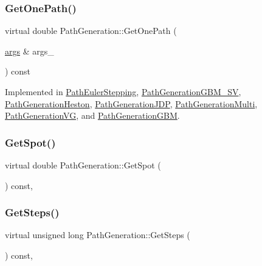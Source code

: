 \subsubsection{\texorpdfstring{Get\+One\+Path()}{GetOnePath()}}
{\footnotesize\ttfamily virtual double Path\+Generation\+::\+Get\+One\+Path (\begin{DoxyParamCaption}\item[{\hyperlink{path__generation_8h_a75c13cde2074f502cc4348c70528572d}{args} \&}]{args\+\_\+ }\end{DoxyParamCaption}) const\hspace{0.3cm}{\ttfamily [pure virtual]}}



Implemented in \hyperlink{classPathEulerStepping_a7e38aa13e5807f3010892f7a4772fac6}{Path\+Euler\+Stepping}, \hyperlink{classPathGenerationGBM__SV_a9db1428d6599489d22b2fa843c56fc31}{Path\+Generation\+G\+B\+M\+\_\+\+SV}, \hyperlink{classPathGenerationHeston_ab523f2de8838e845405482b714656015}{Path\+Generation\+Heston}, \hyperlink{classPathGenerationJDP_ad30abaeb2b4793a5fde77e9ce77e8691}{Path\+Generation\+J\+DP}, \hyperlink{classPathGenerationMulti_aca9ffcbef7f0ae7e00177104b97abbf1}{Path\+Generation\+Multi}, \hyperlink{classPathGenerationVG_ae5b96a684d59be9b06aa3b2eb8ac5b5f}{Path\+Generation\+VG}, and \hyperlink{classPathGenerationGBM_ac8bbe44a4ec2fd4a2249086d912dff33}{Path\+Generation\+G\+BM}.

\hypertarget{classPathGeneration_a53f386b51d74fb8e100e18cf904ef801}{}\label{classPathGeneration_a53f386b51d74fb8e100e18cf904ef801} 
\subsubsection{\texorpdfstring{Get\+Spot()}{GetSpot()}}
{\footnotesize\ttfamily virtual double Path\+Generation\+::\+Get\+Spot (\begin{DoxyParamCaption}{ }\end{DoxyParamCaption}) const\hspace{0.3cm}{\ttfamily [inline]}, {\ttfamily [virtual]}}

\hypertarget{classPathGeneration_a7a7ad14af906f2282663ac78d7b21706}{}\label{classPathGeneration_a7a7ad14af906f2282663ac78d7b21706} 
\subsubsection{\texorpdfstring{Get\+Steps()}{GetSteps()}}
{\footnotesize\ttfamily virtual unsigned long Path\+Generation\+::\+Get\+Steps (\begin{DoxyParamCaption}{ }\end{DoxyParamCaption}) const\hspace{0.3cm}{\ttfamily [inline]}, {\ttfamily [virtual]}}

